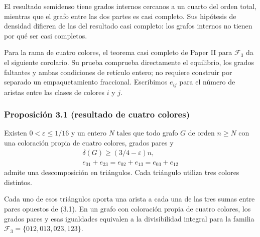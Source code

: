\documentclass[spanish,11pt,a4paper]{article}
\begin{document}
El resultado semidenso tiene grados internos cercanos a un cuarto del orden total, mientras que el grafo entre las dos partes es casi completo. Sus hipótesis de densidad difieren de las del resultado casi completo: los grafos internos no tienen por qué ser casi completos.

Para la rama de cuatro colores, el teorema casi completo de Paper II para \(\mathcal F_3\) da el siguiente corolario. Su prueba comprueba directamente el equilibrio, los grados faltantes y ambas condiciones de retículo entero; no requiere construir por separado un empaquetamiento fraccional. Escribimos \(e_{ij}\) para el número de aristas entre las clases de colores \(i\) y \(j\).


\subsubsection{Proposición 3.1 (resultado de cuatro colores)}\label{proposiciuxf3n-3.1-resultado-de-cuatro-colores}

Existen \(0<\varepsilon\le1/16\) y un entero \(N\) tales que todo grafo \(G\) de orden \(n\ge N\) con una coloración propia de cuatro colores, grados pares y \[\begin{gathered}
\delta(G)\ge(3/4-\varepsilon)n,
\\
e_{01}+e_{23}=e_{02}+e_{13}=e_{03}+e_{12}
\end{gathered}
\tag{3.1}\] admite una descomposición en triángulos. Cada triángulo utiliza tres colores distintos.

Cada uno de esos triángulos aporta una arista a cada una de las tres sumas entre pares opuestos de (3.1). En un grafo con coloración propia de cuatro colores, los grados pares y esas igualdades equivalen a la divisibilidad integral para la familia \(\mathcal F_3=\{012,013,023,123\}\).
\end{document}
